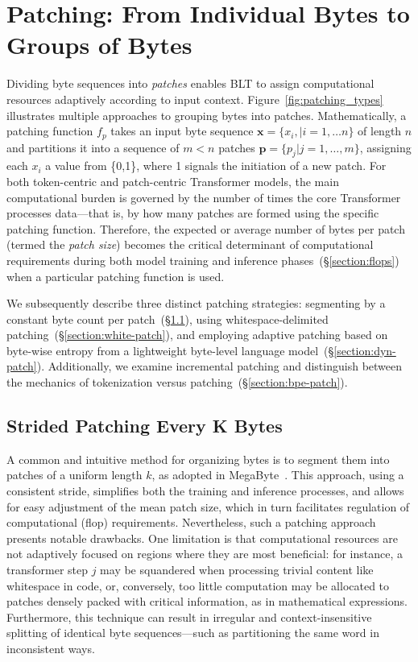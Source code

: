 \section{Patching: From Individual Bytes to Groups of Bytes}
\label{section:patching}

Dividing byte sequences into \textit{patches} enables {\textsc BLT} to assign computational resources adaptively according to input context. Figure~\ref{fig:patching_types} illustrates multiple approaches to grouping bytes into patches. Mathematically, a patching function $f_p$ takes an input byte sequence $\pmb{x}=\{x_i,|i=1,\ldots n\}$ of length $n$ and partitions it into a sequence of $m < n$ patches $\pmb{p}=\{p_j|j=1,\ldots,m\}$, assigning each $x_i$ a value from \{0,1\}, where 1 signals the initiation of a new patch. For both token-centric and patch-centric Transformer models, the main computational burden is governed by the number of times the core Transformer processes data—that is, by how many patches are formed using the specific patching function. Therefore, the expected or average number of bytes per patch (termed the \textit{patch size}) becomes the critical determinant of computational requirements during both model training and inference phases~(\S\ref{section:flops}) when a particular patching function is used.

We subsequently describe three distinct patching strategies: segmenting by a constant byte count per patch~(\S\ref{section:static-patch}), using whitespace-delimited patching~(\S\ref{section:white-patch}), and employing adaptive patching based on byte-wise entropy from a lightweight byte-level language model~(\S\ref{section:dyn-patch}). Additionally, we examine incremental patching and distinguish between the mechanics of tokenization versus patching~(\S\ref{section:bpe-patch}).

\subsection{Strided Patching Every K Bytes}
\label{section:static-patch}

A common and intuitive method for organizing bytes is to segment them into patches of a uniform length $k$, as adopted in MegaByte~\citep{yu2023megabyte}. This approach, using a consistent stride, simplifies both the training and inference processes, and allows for easy adjustment of the mean patch size, which in turn facilitates regulation of computational (flop) requirements. Nevertheless, such a patching approach presents notable drawbacks. One limitation is that computational resources are not adaptively focused on regions where they are most beneficial: for instance, a transformer step $j$ may be squandered when processing trivial content like whitespace in code, or, conversely, too little computation may be allocated to patches densely packed with critical information, as in mathematical expressions. Furthermore, this technique can result in irregular and context-insensitive splitting of identical byte sequences—such as partitioning the same word in inconsistent ways.

